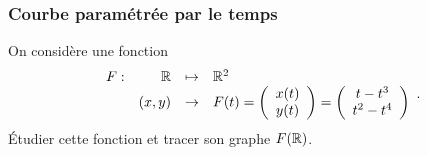 \subsubsection{Courbe paramétrée par le temps}

On considère une fonction 
$$
\begin{array}{rrcl}
  F : & \mathbb{R} & \mapsto & \mathbb{R}^2 \\
  & (x, y) & \to & F(t) 
  = \left(\begin{array}{c} x(t) \\ y(t) \end{array}\right)
  = \left(\begin{array}{c} t - t^3 \\ t^2 - t^4 \end{array}\right)
\end{array}.
$$
\'Etudier cette fonction et tracer son graphe $F(\mathbb{R})$.
